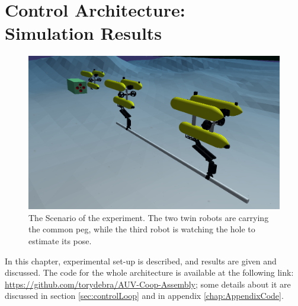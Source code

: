 
\chapter[Control Architecture: Simulation Results]{Control Architecture: \\ Simulation Results}
\label{chap:results}
\ifpdf
\graphicspath{{Results/Figures/PNG/}{Results/Figures/PDF/}{Results/Figures/}}
\else
\graphicspath{{Results/Figures/EPS/}{Results/Figures/}}
\fi

\begin{figure}[H]
	\centering
	\includegraphics[width=14.5cm]{scenario_whole.png}
	\caption[The Scenario with the two robot carrying the peg and the vision robot watching the hole]{The Scenario of the experiment. The two twin robots are carrying the common peg, while the third robot is watching the hole to estimate its pose.}
	\label{fig:method_uwsim}
\end{figure}

In this chapter, experimental set-up is described, and results are given and discussed. The code for the whole architecture is available at the following link:\\ \mbox{\href{https://github.com/torydebra/AUV-Coop-Assembly}{https://github.com/torydebra/AUV-Coop-Assembly}}; some details about it are discussed in section \ref{sec:controlLoop} and in appendix \ref{chap:AppendixCode}.

